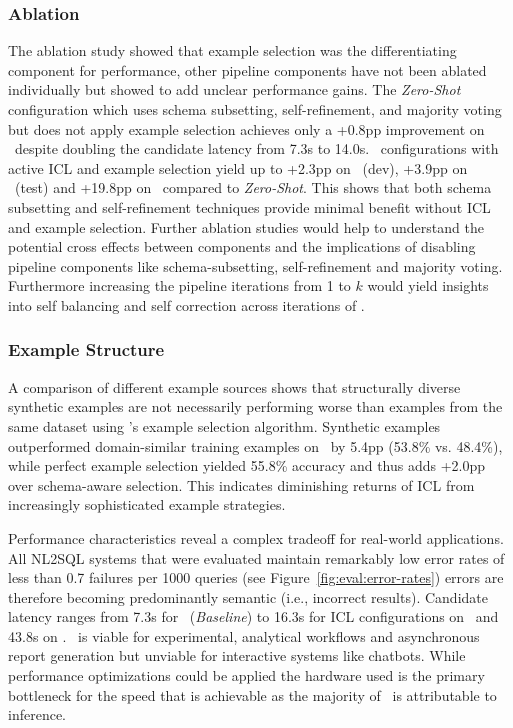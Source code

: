 \subsubsection{Ablation}

The ablation study showed that example selection was the differentiating
component for performance, other pipeline components have not been ablated
individually but showed to add unclear performance gains. The
\textit{Zero-Shot} configuration which uses schema subsetting, self-refinement,
and majority voting but does not apply example selection achieves only a +0.8pp
improvement on \Spider~despite doubling the candidate latency from 7.3s to
14.0s. \Natural~configurations with active ICL and example selection yield up
to +2.3pp on \Spider~(dev), +3.9pp on \Spider~(test) and +19.8pp on
\Bird~compared to \textit{Zero-Shot}. This shows that both schema subsetting
and self-refinement techniques provide minimal benefit without ICL and example
selection. Further ablation studies would help to understand the potential
cross effects between components and the implications of disabling pipeline
components like schema-subsetting, self-refinement and majority voting.
Furthermore increasing the pipeline iterations from 1 to $k$ would yield
insights into self balancing and self correction across iterations of \Natural.

\subsubsection{Example Structure}

A comparison of different example sources shows that structurally diverse
synthetic examples are not necessarily performing worse than examples from the
same dataset using \Natural's example selection algorithm. Synthetic examples
outperformed domain-similar training examples on \Bird~by 5.4pp (53.8\% vs.
48.4\%), while perfect example selection yielded 55.8\% accuracy and thus adds
+2.0pp over schema-aware selection. This indicates diminishing returns of
ICL from increasingly sophisticated example strategies.

Performance characteristics reveal a complex tradeoff for real-world
applications. All NL2SQL systems that were evaluated maintain remarkably
low error rates of less than 0.7 failures per 1000 queries (see
Figure~\ref{fig:eval:error-rates}) errors are therefore becoming predominantly
semantic (i.e., incorrect results). Candidate latency ranges from
7.3s for \Natural~(\textit{Baseline}) to 16.3s for ICL configurations on
\Spider~and 43.8s on \Bird. \Natural~is viable for experimental,
analytical workflows and asynchronous report generation but unviable for
interactive systems like chatbots. While performance optimizations
could be applied the hardware used is the primary bottleneck for the speed that
is achievable as the majority of \CL~is attributable to inference.

